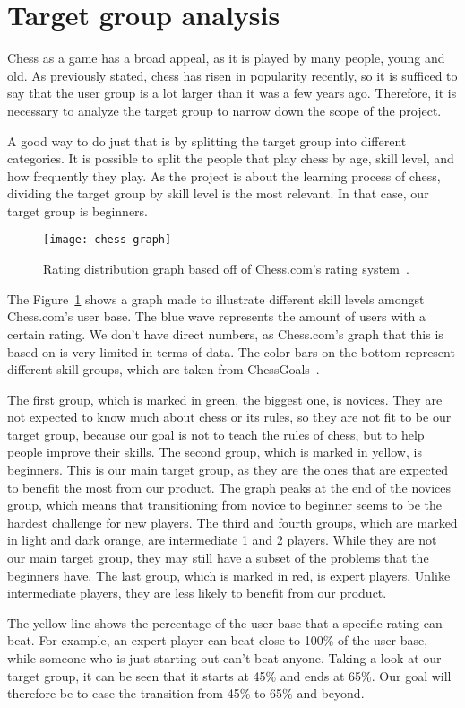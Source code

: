 \section{Target group analysis}\label{sec:target-group-analysis}

Chess as a game has a broad appeal, as it is played by many people, young and old.
As previously stated, chess has risen in popularity recently, so it is sufficed to say that the user group is a lot
larger than it was a few years ago.
Therefore, it is necessary to analyze the target group to narrow down the scope of the project.

A good way to do just that is by splitting the target group into different categories.
It is possible to split the people that play chess by age, skill level, and how frequently they play.
As the project is about the learning process of chess, dividing the target group by skill level is the most relevant.
In that case, our target group is beginners.


\begin{figure}
    \centering
    \texttt{[image: chess-graph]}
    \caption{Rating distribution graph based off of Chess.com's rating system~\cite{chess-ratings}.}\label{fig:graph}
\end{figure}

The Figure~\ref{fig:graph} shows a graph made to illustrate different skill levels amongst Chess.com's user base.
The blue wave represents the amount of users with a certain rating.
We don't have direct numbers, as Chess.com's graph that this is based on is very limited in terms of data.
The color bars on the bottom represent different skill groups, which are taken from ChessGoals~\cite{chess-ratings}.


The first group, which is marked in green, the biggest one, is novices. 
They are not expected to know much about chess or its rules, so they are not fit to be our target group, because our 
goal is not to teach the rules of chess, but to help people improve their skills.
The second group, which is marked in yellow, is beginners.
This is our main target group, as they are the ones that are expected to benefit the most from our product.
The graph peaks at the end of the novices group, which means that transitioning from novice to beginner seems to be the 
hardest challenge for new players.
The third and fourth groups, which are marked in light and dark orange, are intermediate 1 and 2 players.
While they are not our main target group, they may still have a subset of the problems that the beginners have.
The last group, which is marked in red, is expert players.
Unlike intermediate players, they are less likely to benefit from our product.

The yellow line shows the percentage of the user base that a specific rating can beat.
For example, an expert player can beat close to 100\% of the user base, while someone who is just starting out can't
beat anyone.
Taking a look at our target group, it can be seen that it starts at 45\% and ends at 65\%.
Our goal will therefore be to ease the transition from 45\% to 65\% and beyond.
